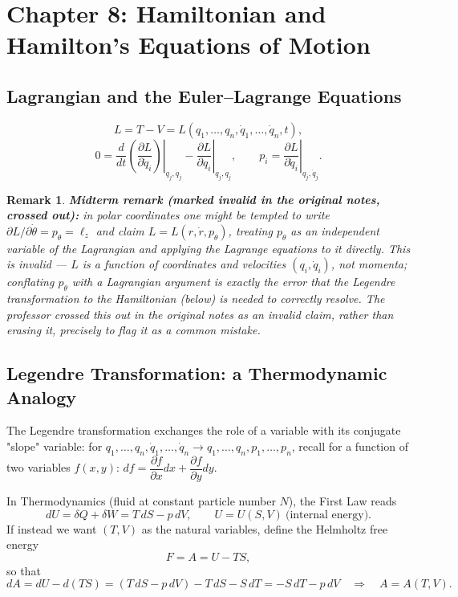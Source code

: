 \documentclass[11pt]{article}
\newtheorem{remark}{Remark}
\begin{document}
\section{Chapter 8: Hamiltonian and Hamilton's Equations of Motion}

\subsection{Lagrangian and the Euler--Lagrange Equations}

\[
L = T - V = L(q_1,\dots,q_n,\dot q_1,\dots,\dot q_n,t),
\]
\[
0 = \left.\frac{d}{dt}\left(\frac{\partial L}{\partial \dot q_i}\right)\right|_{q_j,\dot q_j} - \left.\frac{\partial L}{\partial q_i}\right|_{q_j,\dot q_j},
\qquad
p_i = \left.\frac{\partial L}{\partial \dot q_i}\right|_{q_j,\dot q_j}.
\]

\begin{remark}
\textbf{Midterm remark (marked invalid in the original notes, crossed out):} in polar
coordinates one might be tempted to write $\partial L/\partial\dot\theta = p_\theta = \ell_z$ and
claim $L = L(r,\dot r, p_\theta)$, treating $p_\theta$ as an independent variable of the
Lagrangian and applying the Lagrange equations to it directly. This is invalid — $L$ is a
function of coordinates and \emph{velocities} $(q_i,\dot q_i)$, not momenta; conflating $p_\theta$
with a Lagrangian argument is exactly the error that the Legendre transformation to the
Hamiltonian (below) is needed to correctly resolve. The professor crossed this out in the
original notes as an invalid claim, rather than erasing it, precisely to flag it as a common
mistake.
\end{remark}

\subsection{Legendre Transformation: a Thermodynamic Analogy}

The Legendre transformation exchanges the role of a variable with its conjugate "slope"
variable: for $q_1,\dots,q_n,\dot q_1,\dots,\dot q_n \to q_1,\dots,q_n,p_1,\dots,p_n$, recall for
a function of two variables $f(x,y)$: $df = \dfrac{\partial f}{\partial x}dx + \dfrac{\partial f}{\partial y}dy$.

In Thermodynamics (fluid at constant particle number $N$), the First Law reads
\[
dU = \delta Q + \delta W = T\,dS - p\,dV, \qquad U = U(S,V) \ \text{(internal energy)}.
\]
If instead we want $(T,V)$ as the natural variables, define the Helmholtz free energy
\[
F = A = U - TS,
\]
so that
\[
dA = dU - d(TS) = (T\,dS - p\,dV) - T\,dS - S\,dT = -S\,dT - p\,dV \quad\Longrightarrow\quad A = A(T,V).
\]
\end{document}
